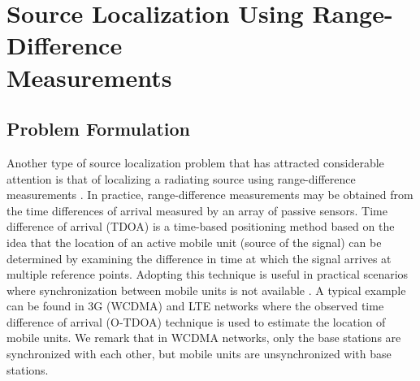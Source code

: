 
\newpage

\section{Source Localization Using Range-Difference\\ Measurements}%
\subsection{Problem Formulation} %

Another type of source localization problem that has attracted considerable attention is that of localizing a radiating source using range-difference measurements \cite{ StLi, BeckStLi}. In practice, range-difference measurements may be obtained from the time differences of arrival measured by an array of passive sensors. Time difference of arrival (TDOA) is a time-based positioning method based on the idea that the location of an active mobile unit (source of the signal)  can be determined by examining the difference in time at which the signal arrives at multiple reference points. 
Adopting this technique is useful in practical scenarios where synchronization between mobile units is not available \cite{GeoLoc}. A typical example can be found in 3G (WCDMA) and LTE networks where the observed time difference of arrival (O-TDOA) technique is used %
to estimate the location of mobile units. We remark that in WCDMA networks, only the base stations are synchronized with each other, but mobile units are unsynchronized with base stations. 

